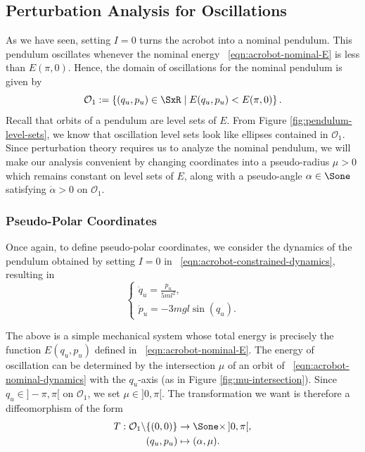 \subsection{Perturbation Analysis for Oscillations}\label{sec:acrobot-proof-o1}
As we have seen, setting \(I = 0\) turns the acrobot into a nominal pendulum. 
This pendulum oscillates whenever the nominal energy
~\eqref{eqn:acrobot-nominal-E} is less than \(E(\pi,0)\). 
Hence, the domain of oscillations for the nominal pendulum is given by
\[
    \mathcal{O}_1 := \left\{ (q_u,p_u) \in \SxR \mid E(q_u,p_u) < E(\pi,0)\right\}
    .
\]
Recall that orbits of a pendulum are level sets of \(E\). 
From Figure \ref{fig:pendulum-level-sets}, we know that oscillation level sets
look like ellipses contained in \(\mathcal{O}_1\).
Since perturbation theory requires us to analyze the nominal pendulum, we will
make our analysis convenient by changing coordinates into a
pseudo-radius \(\mu > 0\) which remains constant on level sets of \(E\), 
along with a pseudo-angle \(\alpha \in \Sone\) satisfying \(\dot{\alpha} > 0\) on
\(\mathcal{O}_1\).

\subsubsection*{Pseudo-Polar Coordinates}

Once again, to define pseudo-polar coordinates, we consider the dynamics of the
pendulum obtained by setting \(I = 0\) in
~\eqref{eqn:acrobot-constrained-dynamics}, resulting in
\begin{equation}\label{eqn:acrobot-nominal-dynamics}
    \begin{cases}
        \dot{q}_u = \frac{p_u}{5ml^2}
        , \\
        \dot{p}_u = -3mgl\sin(q_u)
        . 
    \end{cases}
\end{equation}

The above is a simple mechanical system whose total energy is precisely the
function \(E(q_u,p_u)\) defined in ~\eqref{eqn:acrobot-nominal-E}.
The energy of oscillation can be determined by the intersection
\(\mu\) of an orbit of ~\eqref{eqn:acrobot-nominal-dynamics}
with the \(q_u\)-axis (as in Figure \ref{fig:mu-intersection}).
Since \(q_u \in ]-\pi,\pi[\) on \(\mathcal{O}_1\), we set \(\mu \in ]0,\pi[\).
The transformation we want is therefore a diffeomorphism of the form
\begin{align*}
    T : \mathcal{O}_1 \backslash \{(0,0)\} &\rightarrow \Sone \times \, ]0,\pi[, \\
    (q_u, p_u) &\mapsto (\alpha,\mu)
    .
\end{align*}

